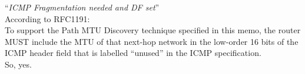 ``\textit{ICMP Fragmentation needed and DF set}''\\
According to RFC1191: \\
 To support the Path MTU Discovery technique specified in this memo, the router MUST include the MTU of that next-hop network in the low-order 16 bits of the ICMP header field that is labelled ``unused'' in the ICMP specification.\\
 So, yes.